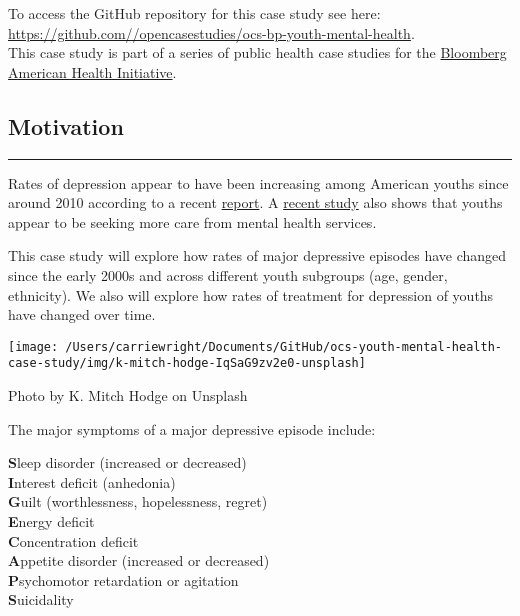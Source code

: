 \documentclass[
]{article}
\begin{document}
To access the GitHub repository for this case study see here:
\url{https://github.com//opencasestudies/ocs-bp-youth-mental-health}.\\
This case study is part of a series of public health case studies for
the \href{https://americanhealth.jhu.edu/open-case-studies}{Bloomberg
American Health Initiative}.

\hypertarget{motivation}{%
\subsection{\texorpdfstring{\textbf{Motivation}}{Motivation}}\label{motivation}}

\begin{center}\rule{0.5\linewidth}{0.5pt}\end{center}

Rates of depression appear to have been increasing among American youths
since around 2010 according to a recent
\href{https://content.apa.org/record/2019-12578-001}{report}. A
\href{https://pubmed.ncbi.nlm.nih.gov/24285382/}{recent study} also
shows that youths appear to be seeking more care from mental health
services.

This case study will explore how rates of major depressive episodes have
changed since the early 2000s and across different youth subgroups (age,
gender, ethnicity). We also will explore how rates of treatment for
depression of youths have changed over time.

\begin{center}\texttt{[image: /Users/carriewright/Documents/GitHub/ocs-youth-mental-health-case-study/img/k-mitch-hodge-IqSaG9zv2e0-unsplash]} \end{center}

{Photo by K. Mitch Hodge on Unsplash}

The major symptoms of a major depressive episode include:

\textbf{S}leep disorder (increased or decreased)\\
\textbf{I}nterest deficit (anhedonia)\\
\textbf{G}uilt (worthlessness, hopelessness, regret)\\
\textbf{E}nergy deficit\\
\textbf{C}oncentration deficit\\
\textbf{A}ppetite disorder (increased or decreased)\\
\textbf{P}sychomotor retardation or agitation\\
\textbf{S}uicidality
\end{document}
